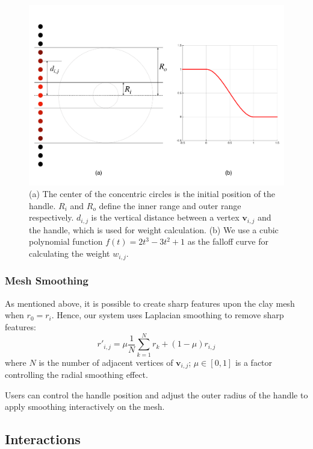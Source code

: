 \documentclass{svjour3}                     %
\begin{document}
\begin{figure}
\includegraphics[width=\textwidth]{fig6.pdf}
\caption{(a) The center of the concentric circles is the initial position of the handle. $R_{i}$ and $R_{o}$ define the inner range and outer range respectively. $d_{i,j}$ is the vertical distance between a vertex $\mathbf{v}_{i,j}$ and the handle, which is used for weight calculation. (b) We use a cubic polynomial function $f(t) = 2t^3 - 3t^2 + 1$ as the falloff curve for calculating the weight $w_{i,j}$. }
\label{fig:deform}
\end{figure}

\subsubsection{Mesh Smoothing}
\label{sec:4.2.4}
As mentioned above, it is possible to create sharp features upon the clay mesh when $r_{0} = r_{i}$. Hence, our system uses Laplacian smoothing to remove sharp features: 
\begin{equation}
r'_{i,j} = 
\mu  \frac{1}{N} 
\sum_{k=1}^N r_{k}
+ (1 - \mu)  r_{i,j}
\end{equation}
where $N$ is the number of adjacent vertices of $\mathbf{v}_{i,j}$; $\mu \in [0,1]$ is a factor controlling the radial smoothing effect.

Users can control the handle position and adjust the outer radius of the handle to apply smoothing interactively on the mesh.

\subsection{Interactions}
\label{sec:4.3}
\end{document}
